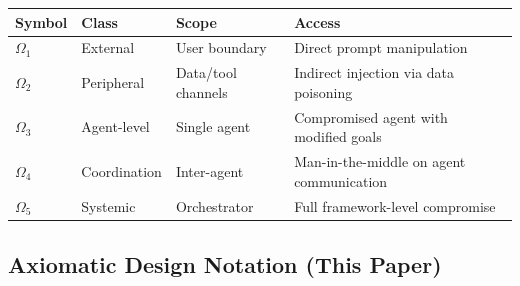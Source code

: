 \documentclass[
]{article}
\newcounter{none} %
\begin{document}
{\def\LTcaptype{none} %
\begin{longtable}[]{@{}
  >{\raggedright\arraybackslash}p{}
  >{\raggedright\arraybackslash}p{}
  >{\raggedright\arraybackslash}p{}
  >{\raggedright\arraybackslash}p{}@{}}
\toprule\noalign{}
\begin{minipage}[b]{\linewidth}\raggedright
Symbol
\end{minipage} & \begin{minipage}[b]{\linewidth}\raggedright
Class
\end{minipage} & \begin{minipage}[b]{\linewidth}\raggedright
Scope
\end{minipage} & \begin{minipage}[b]{\linewidth}\raggedright
Access
\end{minipage} \\
\midrule\noalign{}
\endhead
\bottomrule\noalign{}
\endlastfoot
\(\Omega_1\) & External & User boundary & Direct prompt manipulation \\
\(\Omega_2\) & Peripheral & Data/tool channels & Indirect injection via
data poisoning \\
\(\Omega_3\) & Agent-level & Single agent & Compromised agent with
modified goals \\
\(\Omega_4\) & Coordination & Inter-agent & Man-in-the-middle on agent
communication \\
\(\Omega_5\) & Systemic & Orchestrator & Full framework-level
compromise \\
\end{longtable}
}

\subsection{Axiomatic Design Notation (This
Paper)}\label{axiomatic-design-notation-this-paper}
\end{document}
